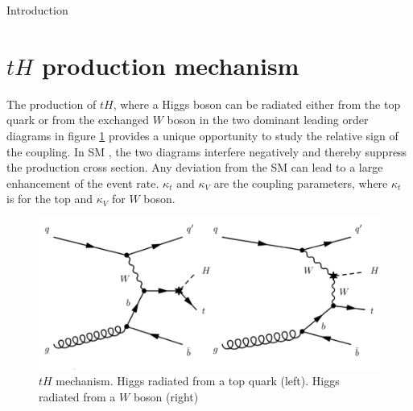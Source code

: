 \begin{chapter}{Introduction}
\section{$tH$ production mechanism}
The production of $tH$, where a Higgs boson can be radiated
either from the top quark or from the exchanged $W$ boson in the two dominant leading order
diagrams in figure \ref{newth} provides a unique opportunity to study the relative sign of the coupling.
In SM , the two diagrams interfere negatively and thereby suppress the production cross section.
Any deviation from the SM can lead to a large enhancement of the event rate.
 $\kappa_t$ and $\kappa_V$ are the coupling parameters, where $\kappa_t$ is for the top and $\kappa_V$ for $W$ boson. \\

\begin{figure}[ht]
	\centering
	\includegraphics[scale=0.5]{Chapter1/newtHq.png}
	\caption[$tH$ mechanism. Higgs radiated from a top quark (left). Higgs radiated from a $W$ boson (right)]{$tH$ mechanism. Higgs radiated from a top quark (left). Higgs radiated from a $W$ boson (right) \protect \cite{bb}} \label{newth}
\end{figure}
\pagebreak



\end{chapter}














